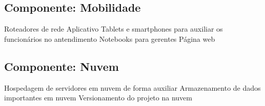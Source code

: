      \subsection{Componente: Mobilidade}
	\begin{outline}
	\1 Roteadores de rede
	\1 Aplicativo
	\1 Tablets e smartphones para auxiliar os funcionários no antendimento
	\1 Notebooks para gerentes 
	\1 P\'{a}gina web
	\end{outline}
     \subsection{Componente: Nuvem}
	\begin{outline}
	\1 Hospedagem de servidores em nuvem de forma auxiliar  
	\1 Armazenamento de dados importantes em nuvem
	\1 Versionamento do projeto na nuvem
	\end{outline}
